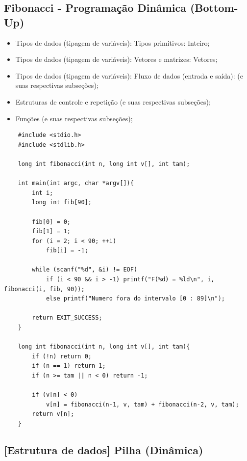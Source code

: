 \documentclass[12pt]{article}
\begin{document}
\newpage
\subsection{Fibonacci - Programação Dinâmica (Bottom-Up)}

\hspace{0.25cm}
\begin{tcolorbox}[colback=violet!5!white,colframe=violet!75!white,title=Capítulos recomendados:]
    \begin{itemize}
        \item Tipos de dados (tipagem de variáveis): Tipos primitivos: Inteiro;
        \item Tipos de dados (tipagem de variáveis): Vetores e matrizes: Vetores;
        \item Tipos de dados (tipagem de variáveis): Fluxo de dados (entrada e saída): (e suas respectivas subseções);
        \item Estruturas de controle e repetição (e suas respectivas subseções);
        \item Funções (e suas respectivas subseções);
    \end{itemize}
\end{tcolorbox}

\hspace{0.25cm}
\begin{lstlisting}
    #include <stdio.h>
    #include <stdlib.h>
    
    long int fibonacci(int n, long int v[], int tam);
    
    int main(int argc, char *argv[]){
    	int i;
        long int fib[90];
    
        fib[0] = 0;
    	fib[1] = 1;
        for (i = 2; i < 90; ++i)
            fib[i] = -1;
            
        while (scanf("%d", &i) != EOF)
            if (i < 90 && i > -1) printf("F(%d) = %ld\n", i, fibonacci(i, fib, 90));
            else printf("Numero fora do intervalo [0 : 89]\n");
            
        return EXIT_SUCCESS;
    }
    
    long int fibonacci(int n, long int v[], int tam){
    	if (!n) return 0;
    	if (n == 1) return 1;
    	if (n >= tam || n < 0) return -1;
    	
    	if (v[n] < 0)
    		v[n] = fibonacci(n-1, v, tam) + fibonacci(n-2, v, tam);
    	return v[n];
    }
\end{lstlisting}

\newpage
\subsection{[Estrutura de dados] Pilha (Dinâmica)}
\end{document}
